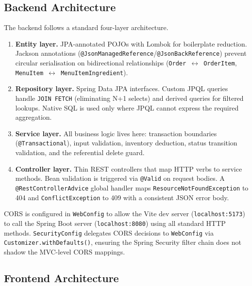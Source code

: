 \documentclass[12pt,a4paper]{article}
\begin{document}
\subsection{Backend Architecture}

The backend follows a standard four-layer architecture.

\begin{enumerate}
    \item \textbf{Entity layer.} JPA-annotated POJOs with Lombok for boilerplate
          reduction. Jackson annotations
          (\texttt{@JsonManagedReference}/\texttt{@JsonBackReference}) prevent
          circular serialisation on bidirectional relationships
          (\texttt{Order $\leftrightarrow$ OrderItem},
          \texttt{MenuItem $\leftrightarrow$ MenuItemIngredient}).

    \item \textbf{Repository layer.} Spring Data JPA interfaces. Custom JPQL
          queries handle \texttt{JOIN FETCH} (eliminating N+1 selects) and
          derived queries for filtered lookups. Native SQL is used only where
          JPQL cannot express the required aggregation.

    \item \textbf{Service layer.} All business logic lives here: transaction
          boundaries (\texttt{@Transactional}), input validation, inventory
          deduction, status transition validation, and the referential delete
          guard.

    \item \textbf{Controller layer.} Thin REST controllers that map HTTP verbs
          to service methods. Bean validation is triggered via \texttt{@Valid}
          on request bodies. A \texttt{@RestControllerAdvice} global handler
          maps \texttt{ResourceNotFoundException} to 404 and
          \texttt{ConflictException} to 409 with a consistent JSON error body.
\end{enumerate}

CORS is configured in \texttt{WebConfig} to allow the Vite dev server
(\texttt{localhost:5173}) to call the Spring Boot server
(\texttt{localhost:8080}) using all standard HTTP methods.
\texttt{SecurityConfig} delegates CORS decisions to \texttt{WebConfig} via
\texttt{Customizer.withDefaults()}, ensuring the Spring Security filter chain
does not shadow the MVC-level CORS mappings.

\subsection{Frontend Architecture}
\end{document}
